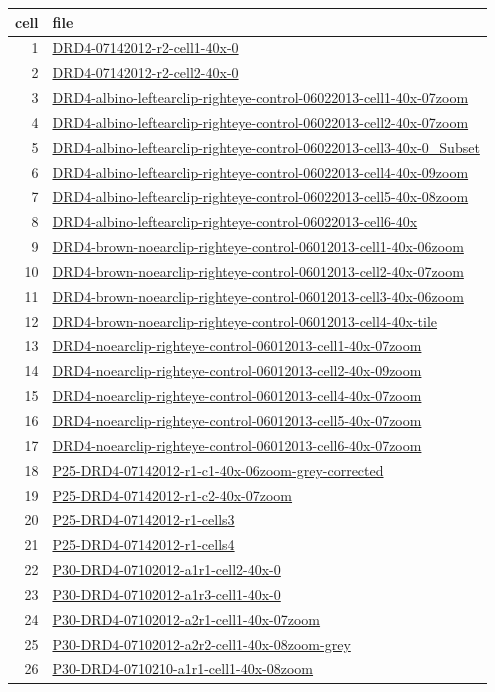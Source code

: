 \documentclass{article}
\renewenvironment{table}[1][ht]{\comment}{\endcomment}
\begin{document}
\begin{table}
  \centering
  \begin{tabular}{rl}
    \toprule
    cell & file \\
    \midrule
1& \url{DRD4-07142012-r2-cell1-40x-0} \\
2& \url{DRD4-07142012-r2-cell2-40x-0} \\
3&
\url{DRD4-albino-leftearclip-righteye-control-06022013-cell1-40x-07zoom} \\
4&
\url{DRD4-albino-leftearclip-righteye-control-06022013-cell2-40x-07zoom} \\
5&
\url{DRD4-albino-leftearclip-righteye-control-06022013-cell3-40x-0_Subset} \\
6&
\url{DRD4-albino-leftearclip-righteye-control-06022013-cell4-40x-09zoom} \\
7&
\url{DRD4-albino-leftearclip-righteye-control-06022013-cell5-40x-08zoom} \\
8& \url{DRD4-albino-leftearclip-righteye-control-06022013-cell6-40x} \\
9&
\url{DRD4-brown-noearclip-righteye-control-06012013-cell1-40x-06zoom} \\
10&
\url{DRD4-brown-noearclip-righteye-control-06012013-cell2-40x-07zoom} \\
11&
\url{DRD4-brown-noearclip-righteye-control-06012013-cell3-40x-06zoom} \\
12&
\url{DRD4-brown-noearclip-righteye-control-06012013-cell4-40x-tile} \\
13& \url{DRD4-noearclip-righteye-control-06012013-cell1-40x-07zoom} \\
14& \url{DRD4-noearclip-righteye-control-06012013-cell2-40x-09zoom} \\
15& \url{DRD4-noearclip-righteye-control-06012013-cell4-40x-07zoom} \\
16& \url{DRD4-noearclip-righteye-control-06012013-cell5-40x-07zoom} \\
17& \url{DRD4-noearclip-righteye-control-06012013-cell6-40x-07zoom} \\
18& \url{P25-DRD4-07142012-r1-c1-40x-06zoom-grey-corrected} \\
19& \url{P25-DRD4-07142012-r1-c2-40x-07zoom} \\
20& \url{P25-DRD4-07142012-r1-cells3} \\
21& \url{P25-DRD4-07142012-r1-cells4} \\
22& \url{P30-DRD4-07102012-a1r1-cell2-40x-0} \\
23& \url{P30-DRD4-07102012-a1r3-cell1-40x-0} \\
24& \url{P30-DRD4-07102012-a2r1-cell1-40x-07zoom} \\
25& \url{P30-DRD4-07102012-a2r2-cell1-40x-08zoom-grey} \\
26& \url{P30-DRD4-0710210-a1r1-cell1-40x-08zoom} \\
\bottomrule
  \end{tabular}
  \caption{List of DRD4 file names in data set.}

\end{table}
\end{document}
